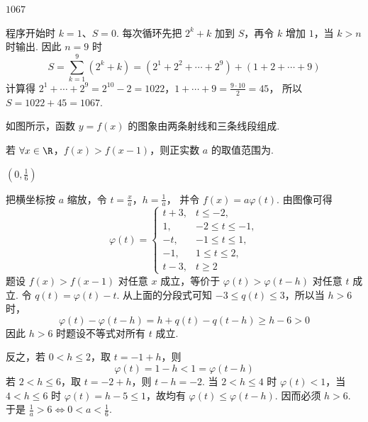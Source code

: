 \begin{answer}
\(1067\)
\end{answer}

\begin{solution}
程序开始时 \(k=1\)、\(S=0\). 每次循环先把 \(2^k+k\) 加到 \(S\)，再令 \(k\) 增加 \(1\)，当 \(k>n\) 时输出.
因此 \(n=9\) 时
\[S=\sum_{k=1}^{9}(2^k+k)=(2^1+2^2+\cdots+2^9)+(1+2+\cdots+9)\]
计算得 \(2^1+\cdots+2^9=2^{10}-2=1022\)，\(1+\cdots+9=\frac{9\cdot10}{2}=45\)，
所以 \(S=1022+45=1067\).
\end{solution}

\begin{problem}
如图所示，函数 \( y = f(x) \) 的图象由两条射线和三条线段组成.

若 \(\forall x\in \R\)，\(f(x) > f(x - 1)\)，则正实数 \(a\) 的取值范围为\fillinblank{}.

\problemresetlayout
{}
\end{problem}

\begin{answer}
\(\left(0,\frac{1}{6}\right)\)
\end{answer}

\begin{solution}
把横坐标按 \(a\) 缩放，令 \(t=\frac{x}{a}\)，\(h=\frac1a\)，
并令 \(f(x)=a\varphi(t)\). 由图像可得
\[
\varphi(t)=
\begin{cases}
t+3,&t\leqslant-2,\\
1,&-2\leqslant t\leqslant-1,\\
-t,&-1\leqslant t\leqslant1,\\
-1,&1\leqslant t\leqslant2,\\
t-3,&t\geqslant2
\end{cases}
\]
题设 \(f(x)>f(x-1)\) 对任意 \(x\) 成立，等价于 \(\varphi(t)>\varphi(t-h)\) 对任意 \(t\) 成立.
令 \(q(t)=\varphi(t)-t\). 从上面的分段式可知 \(-3\leqslant q(t)\leqslant3\)，所以当 \(h>6\) 时，
\[
\varphi(t)-\varphi(t-h)
=h+q(t)-q(t-h)\geqslant h-6>0
\]
因此 \(h>6\) 时题设不等式对所有 \(t\) 成立.

反之，若 \(0<h\leqslant2\)，取 \(t=-1+h\)，则
\[
\varphi(t)=1-h<1=\varphi(t-h)
\]
若 \(2<h\leqslant6\)，取 \(t=-2+h\)，则 \(t-h=-2\). 当 \(2<h\leqslant4\) 时 \(\varphi(t)<1\)，当 \(4<h\leqslant6\) 时 \(\varphi(t)=h-5\leqslant1\)，故均有 \(\varphi(t)\leqslant\varphi(t-h)\). 因而必须 \(h>6\).
于是 \(\frac1a>6\Longleftrightarrow0<a<\frac16\).
\end{solution}


